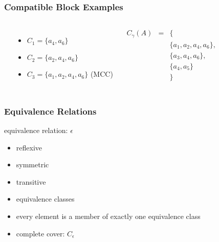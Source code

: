\documentclass[dvipsnames]{beamer}
\begin{document}
\begin{frame}
  \frametitle{Compatible Block Examples}

  \begin{example}
    \begin{columns}
      \begin{center}
      \end{center}

      \pause
      \begin{itemize}
        \item $C_1=\{a_4,a_6\}$
        \item $C_2=\{a_2,a_4,a_6\}$
        \item $C_3=\{a_1,a_2,a_4,a_6\}$ (MCC)
      \end{itemize}

      \pause
      \medskip
      \begin{eqnarray*}
        C_\gamma (A) & = & \{\\
                      &   & \{a_1,a_2,a_4,a_6\},\\
                      &   & \{a_3,a_4,a_6\},\\
                      &   & \{a_4,a_5\}\\
                      &   & \}
      \end{eqnarray*}
    \end{columns}
  \end{example}
\end{frame}

\begin{frame}
  \frametitle{Equivalence Relations}

  \begin{definition}
    \alert{equivalence relation}: $\epsilon$
    \begin{itemize}
      \item reflexive
      \item symmetric
      \item transitive
    \end{itemize}
  \end{definition}

  \pause
  \begin{itemize}
    \item equivalence classes
    \item every element is a member of exactly one equivalence class

    \pause
    \medskip
    \item complete cover: $C_\epsilon$
  \end{itemize}
\end{frame}
\end{document}
